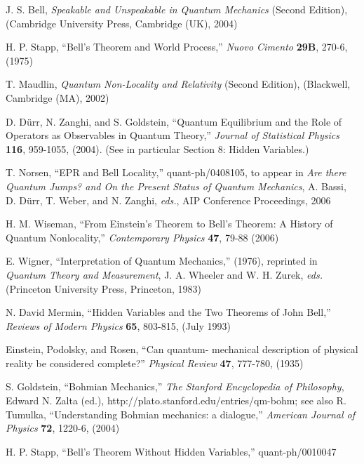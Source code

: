 \documentclass[aps,prc,onecolumn,12pt]{revtex4-2}
\begin{document}
\begin{thebibliography}{00}
\raggedright
{}
J. S. Bell, \emph{Speakable and Unspeakable in Quantum Mechanics}
(Second Edition), (Cambridge University Press, Cambridge (UK), 2004)

H. P. Stapp, ``Bell's Theorem and World Process,'' \emph{Nuovo
  Cimento} {\bf{29B}}, 270-6, (1975)

  T. Maudlin, \emph{Quantum Non-Locality and
    Relativity} (Second Edition), (Blackwell, Cambridge (MA), 2002)

  D. D\"urr, N. Zanghi, and S. Goldstein, ``Quantum
  Equilibrium and the Role of Operators as Observables in Quantum
Theory,'' \emph{Journal of Statistical Physics} {\bf{116}}, 959-1055,
  (2004).  (See in particular Section 8:  Hidden Variables.)

  T. Norsen, ``EPR and Bell Locality,''
  quant-ph/0408105, to appear in \emph{Are there Quantum Jumps? and On
  the Present Status of Quantum Mechanics}, A. Bassi, D. D\"urr,
  T. Weber, and N. Zanghi, \emph{eds.}, AIP Conference Proceedings, 2006

  H. M. Wiseman, ``From Einstein's Theorem to Bell's
Theorem:  A History of Quantum Nonlocality,'' \emph{Contemporary
  Physics} {\bf{47}}, 79-88 (2006)

  E. Wigner, ``Interpretation of
  Quantum Mechanics,'' (1976), reprinted in \emph{Quantum Theory and
  Measurement}, J. A. Wheeler and W. H. Zurek, \emph{eds.}
  (Princeton University Press, Princeton, 1983)

  N. David Mermin, ``Hidden
  Variables and the Two Theorems of John Bell,'' \emph{Reviews of Modern
  Physics} {\bf{65}}, 803-815, (July 1993)

  Einstein, Podolsky, and Rosen, ``Can quantum-
  mechanical description of physical reality be considered
  complete?'' \emph{Physical Review} {\bf{47}}, 777-780, (1935)

  S. Goldstein, ``Bohmian Mechanics,'' \emph{The
    Stanford Encyclopedia of Philosophy}, Edward
    N. Zalta (ed.), http://plato.stanford.edu/entries/qm-bohm; see
    also R. Tumulka, ``Understanding Bohmian mechanics: a dialogue,''
    \emph{American Journal of Physics} {\bf{72}}, 1220-6, (2004)

  H. P. Stapp, ``Bell's Theorem Without Hidden
  Variables,'' quant-ph/0010047


\end{thebibliography}
\end{document}
